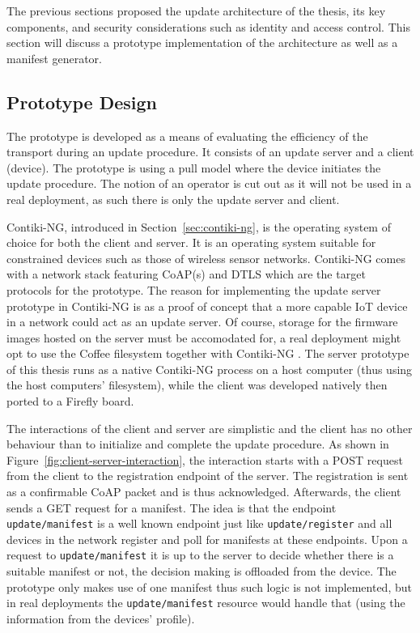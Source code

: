 \documentclass[0-thesis.tex]{subfiles}
\begin{document}
The previous sections proposed the update architecture of the thesis, its key components,
and security considerations such as identity and access control. This section will discuss
a prototype implementation of the architecture as well as a manifest generator. 

\subsection{Prototype Design}
\label{ssec:prototype-design}
The prototype is developed as a means of evaluating the efficiency of the transport during
an update procedure. It consists of an update server and a client (device). The prototype
is using a pull model where the device initiates the update procedure. The notion of an
operator is cut out as it will not be used in a real deployment, as such there is only the
update server and client.

Contiki-NG, introduced in Section~\ref{sec:contiki-ng}, is the operating system of choice
for both the client and server. It is an operating system suitable for constrained devices
such as those of wireless sensor networks. Contiki-NG comes with a network stack featuring
CoAP(s) and DTLS which are the target protocols for the prototype. The reason for
implementing the update server prototype in Contiki-NG is as a proof of concept that a
more capable IoT device in a network could act as an update server. Of course, storage for
the firmware images hosted on the server must be accomodated for, a real deployment might
opt to use the Coffee filesystem together with Contiki-NG \parencite{coffee}. The server
prototype of this thesis runs as a native Contiki-NG process on a host computer (thus
using the host computers' filesystem), while the client was developed natively then ported
to a Firefly board. %

The interactions of the client and server are simplistic and the client has no other
behaviour than to initialize and complete the update procedure. As shown in
Figure~\ref{fig:client-server-interaction}, the interaction starts with a POST request
from the client to the registration endpoint of the server. The registration is sent as a
confirmable CoAP packet and is thus acknowledged. Afterwards, the client sends a GET
request for a manifest. The idea is that the endpoint \texttt{update/manifest} is a well
known endpoint just like \texttt{update/register} and all devices in the network register
and poll for manifests at these endpoints. Upon a request to \texttt{update/manifest} it
is up to the server to decide whether there is a suitable manifest or not, the decision
making is offloaded from the device. The prototype only makes use of one manifest thus
such logic is not implemented, but in real deployments the \texttt{update/manifest}
resource would handle that (using the information from the devices' profile).
\end{document}

